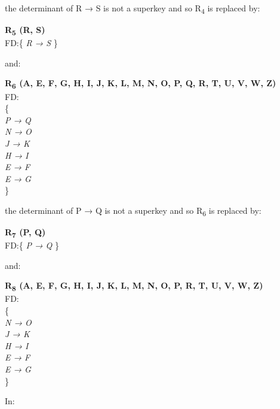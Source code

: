 the determinant of R → S is not a superkey and so R\textsubscript{4} is replaced by:\\

\begin{adjustwidth}{2cm}{}
\textbf{R\textsubscript{5} (R, S)}\\
FD:\{
\textit{ 
R → S 
}
\} \\
\end{adjustwidth} 

and:\\

\begin{adjustwidth}{2cm}{}
\textbf{R\textsubscript{6} (A, E, F, G, H, I, J, K, L, M, N, O, P, Q, R, T, U, V, W, Z)}\\
FD:\\
\{\\
\textit{ 
P → Q\\
N → O\\
J → K\\
H → I\\
E → F\\
E → G \\
}
\} \\
\end{adjustwidth}

the determinant of P → Q is not a superkey and so R\textsubscript{6} is replaced by:\\

\begin{adjustwidth}{2cm}{}
\textbf{R\textsubscript{7} (P, Q)}\\
FD:\{
\textit{ 
P → Q 
}
\} \\
\end{adjustwidth} 

and:\\

\begin{adjustwidth}{2cm}{}
\textbf{R\textsubscript{8} (A, E, F, G, H, I, J, K, L, M, N, O, P, R, T, U, V, W, Z)}\\
FD:\\
\{\\
\textit{ 
N → O\\
J → K\\
H → I\\
E → F\\
E → G\\
}
\} \\
\end{adjustwidth}

In:\\

